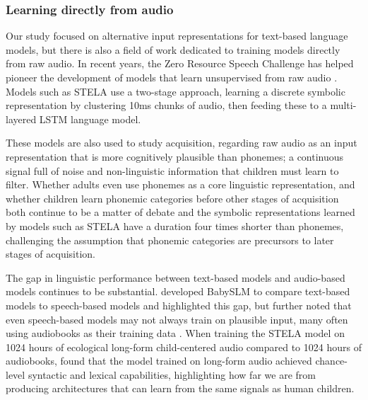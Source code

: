 \subsubsection{Learning directly from audio}
\label{sec:audiomodels}

Our study focused on alternative input representations for text-based language models, but there is also a field of work dedicated to training models directly from raw audio.
In recent years, the Zero Resource Speech Challenge has helped pioneer the development of models that learn unsupervised from raw audio \citep{dunbar_self-supervised_2022}. Models such as STELA \citep{schatz2021early, lavechin2022can} use a two-stage approach, learning a discrete symbolic representation by clustering 10ms chunks of audio, then feeding these to a multi-layered LSTM language model.

These models are also used to study acquisition, regarding raw audio as an input representation that is more cognitively plausible than phonemes; a continuous signal full of noise and non-linguistic information that children must learn to filter. Whether adults even use phonemes as a core linguistic representation, and whether children learn phonemic categories before other stages of acquisition both continue to be a matter of debate \citep{kazanina2018phonemes, matusevych2023infant} and the symbolic representations learned by models such as STELA have a duration four times shorter than phonemes, challenging the assumption that phonemic categories are precursors to later stages of acquisition. 

The gap in linguistic performance between text-based models and audio-based models continues to be substantial. \citet{lavechin} developed BabySLM to compare text-based models to speech-based models and highlighted this gap, but further noted that even speech-based models may not always train on plausible input, many often using audiobooks as their training data \citep{Kahn_2020}. When training the STELA model on 1024 hours of ecological long-form child-centered audio compared to 1024 hours of audiobooks, \citet{lavechin} found that the model trained on long-form audio achieved chance-level syntactic and lexical capabilities, highlighting how far we are from producing architectures that can learn from the same signals as human children.


